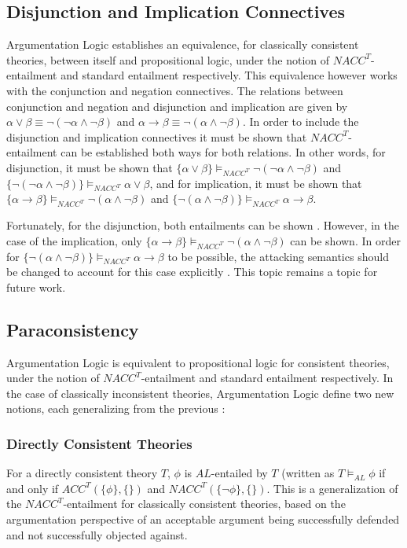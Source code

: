 \documentclass[11pt,twoside,a4paper]{report}
\begin{document}
\subsection{Disjunction and Implication Connectives}
Argumentation Logic establishes an equivalence, for classically consistent theories, between itself and propositional logic, under the notion of $NACC^T$-entailment and standard entailment respectively. This equivalence however works with the conjunction and negation connectives. The relations between conjunction and negation and disjunction and implication are given by $\alpha\vee\beta \equiv \neg(\neg\alpha\wedge\neg\beta)$ and $\alpha\rightarrow\beta \equiv \neg(\alpha\wedge\neg\beta)$. In order to include the disjunction and implication connectives it must be shown that $NACC^T$-entailment can be established both ways for both relations. In other words, for disjunction, it must be shown that $\{\alpha\vee\beta\}\models_{NACC^T}\neg(\neg\alpha\wedge\neg\beta)$ and $\{\neg(\neg\alpha\wedge\neg\beta)\}\models_{NACC^T}\alpha\vee\beta$, and for implication, it must be shown that $\{\alpha\rightarrow\beta\}\models_{NACC^T}\neg(\alpha\wedge\neg\beta)$ and $\{\neg(\alpha\wedge\neg\beta)\}\models_{NACC^T}\alpha\rightarrow\beta$.

Fortunately, for the disjunction, both entailments can be shown \citep*[pp. 11-12]{alpaper}. However, in the case of the implication, only $\{\alpha\rightarrow\beta\}\models_{NACC^T}\neg(\alpha\wedge\neg\beta)$ can be shown. In order for $\{\neg(\alpha\wedge\neg\beta)\}\models_{NACC^T}\alpha\rightarrow\beta$ to be possible, the attacking semantics should be changed to account for this case explicitly \citep*[pp. 12-13]{alpaper}. This topic remains a topic for future work.

\subsection{Paraconsistency}
Argumentation Logic is equivalent to propositional logic for consistent theories, under the notion of $NACC^T$-entailment and standard entailment respectively. In the case of classically inconsistent theories, Argumentation Logic define two new notions, each generalizing from the previous \citep*[pp. 13-15]{alpaper}:

\subsubsection{Directly Consistent Theories}
For a directly consistent theory $T$, $\phi$ is $AL$-entailed by $T$ (written as $T\models_{AL}\phi$ if and only if $ACC^T(\{\phi\},\{\})$ and $NACC^T(\{\neg\phi\},\{\})$. This is a generalization of the $NACC^T$-entailment for classically consistent theories, based on the argumentation perspective of an acceptable argument being successfully defended and not successfully objected against.
\end{document}
